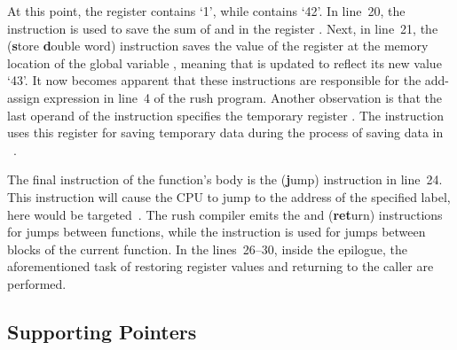 At this point, the register  contains `1', while  contains `42'.
In line~20, the  instruction is used to save the sum of  and  in the register .
Next, in line~21, the  (\textbf{s}tore \textbf{d}ouble word) instruction saves the value of the register  at the memory location of the global variable ,
meaning that  is updated to reflect its new value `43'.
It now becomes apparent that these instructions are responsible for the add-assign expression in line~4 of the rush program.
Another observation is that the last operand of the  instruction specifies the temporary register .
The instruction uses this register for saving temporary data during the process of saving data in ~\cite[Reference Card]{Patterson2017}.

The final instruction of the  function's body is the  (\textbf{j}ump) instruction in line~24.
This instruction will cause the CPU to jump to the address of the specified label,
here  would be targeted~\cite[p.~17]{Patterson2017}.
The rush compiler emits the  and  (\textbf{ret}urn) instructions for jumps between functions,
while the  instruction is used for jumps between blocks of the current function.
In the lines~26--30, inside the epilogue, the aforementioned task of restoring register values and returning to the caller are performed.

\subsection{Supporting Pointers}

\noindent
\begin{minipage}{.34\textwidth}
	\centering
\end{minipage}%
\hspace{3cm}
\begin{minipage}{.45\textwidth}
	\centering
	\vspace{.1cm}
\end{minipage}


